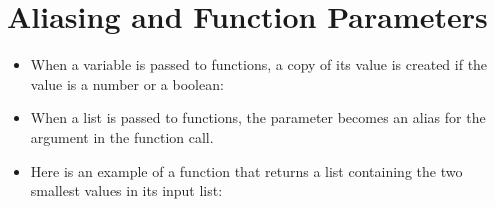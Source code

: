 \documentclass[letterpaper,10pt,english]{sphinxmanual}
\begin{document}
\section{Aliasing and Function Parameters}
\label{\detokenize{lecture_notes/lec10_lists2:aliasing-and-function-parameters}}\begin{itemize}
\item {} 
When a variable is passed to functions, a copy of its value is
created if the value is a number or a boolean:

\begin{sphinxVerbatim}[commandchars=\\\{\}]
  
      
     

  
  
 
 
 
\end{sphinxVerbatim}

\item {} 
When a list is passed to functions, the parameter becomes an alias
for the argument in the function call.

\item {} 
Here is an example of a function that returns a list containing the
two smallest values in its input list:

\begin{sphinxVerbatim}[commandchars=\\\{\}]
 
       \PYG{p}{[}\PYG{p}{]}
        
         \PYG{p}{[}\PYG{p}{]}
            
             \PYG{p}{[}\PYG{p}{]}
      


\end{sphinxVerbatim}
\end{itemize}
\end{document}
